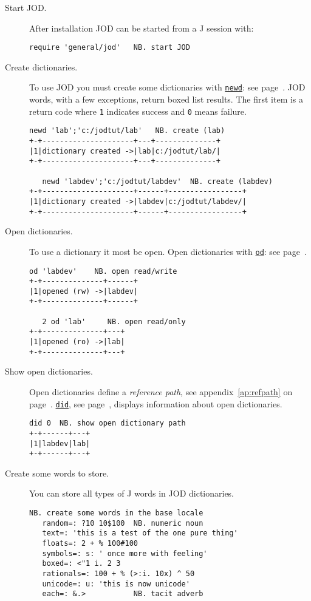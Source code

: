 \begin{description}
\item[Start JOD.]  After installation JOD can be started from a J session with:
\begin{lstlisting}[frame=single,framerule=0pt]
   require 'general/jod'   NB. start JOD 
\end{lstlisting}


\item[Create dictionaries.] To use JOD you must create some dictionaries
with \hyperlink{il:newd}{\texttt{newd}}: see page~\pageref{ss:newd}.
JOD words, with a few exceptions, return boxed list results.  The first
item is a return code where \texttt{1} indicates success and \texttt{0} means failure.
\begin{lstlisting}[frame=single,framerule=0pt]
   newd 'lab';'c:/jodtut/lab'   NB. create (lab)
+-+---------------------+---+--------------+
|1|dictionary created ->|lab|c:/jodtut/lab/|
+-+---------------------+---+--------------+

   newd 'labdev';'c:/jodtut/labdev'  NB. create (labdev)
+-+---------------------+------+-----------------+
|1|dictionary created ->|labdev|c:/jodtut/labdev/|
+-+---------------------+------+-----------------+
\end{lstlisting}

\item[Open dictionaries.] To use a dictionary it most be open. Open
dictionaries with \hyperlink{il:odd}{\texttt{od}}: see page~\pageref{ss:od}.
\begin{lstlisting}[frame=single,framerule=0pt] 
   od 'labdev'    NB. open read/write
+-+--------------+------+
|1|opened (rw) ->|labdev|
+-+--------------+------+
 
   2 od 'lab'     NB. open read/only
+-+--------------+---+
|1|opened (ro) ->|lab|
+-+--------------+---+
\end{lstlisting}

\item[Show open dictionaries.] Open dictionaries define a \emph{reference path}, see
appendix~\ref{ap:refpath} on page~\pageref{ap:refpath}. \hyperlink{il:did}{\texttt{did}}, see page~\pageref{ss:did}, displays information about open dictionaries.
\begin{lstlisting}[frame=single,framerule=0pt]
   did 0  NB. show open dictionary path
+-+------+---+
|1|labdev|lab|
+-+------+---+
\end{lstlisting}

\item[Create some words to store.] You can store all types of J words
in JOD dictionaries.
\begin{lstlisting}[frame=single,framerule=0pt]
   NB. create some words in the base locale
   random=: ?10 10$100  NB. numeric noun
   text=: 'this is a test of the one pure thing'
   floats=: 2 + % 100#100
   symbols=: s: ' once more with feeling'
   boxed=: <"1 i. 2 3
   rationals=: 100 + % (>:i. 10x) ^ 50
   unicode=: u: 'this is now unicode'
   each=: &.>           NB. tacit adverb
   

\end{lstlisting}
\end{description}
